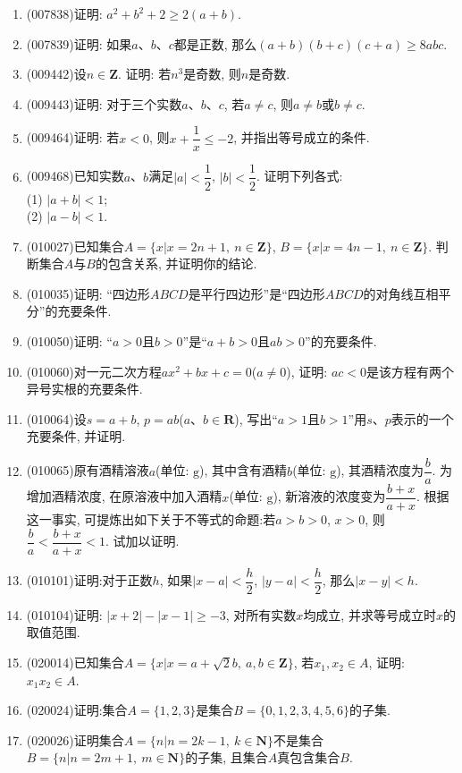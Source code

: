 \documentclass[10pt,a4paper]{article}
\begin{document}
\begin{enumerate}[1.]
\item {\tiny (007838)}证明: $a^2+b^2+2\ge 2(a+b)$.
\item {\tiny (007839)}证明: 如果$a$、$b$、$c$都是正数, 那么$(a+b)(b+c)(c+a)\ge 8abc$.
\item {\tiny (009442)}设$n\in \mathbf{Z}$. 证明: 若$n^3$是奇数, 则$n$是奇数.
\item {\tiny (009443)}证明: 对于三个实数$a$、$b$、$c$, 若$a\ne c$, 则$a\ne b$或$b\ne c$.
\item {\tiny (009464)}证明: 若$x<0$, 则$x+\dfrac 1x\le -2$, 并指出等号成立的条件.
\item {\tiny (009468)}已知实数$a$、$b$满足$|a| <\dfrac 12$, $|b| <\dfrac 12$. 证明下列各式:\\
(1) $|a+b| <1$;\\
(2) $|a-b| <1$.
\item {\tiny (010027)}已知集合$A=\{x|x=2n+1,\ n\in \mathbf{Z}\}$, $B=\{x|x=4n-1,\ n\in \mathbf{Z}\}$. 判断集合$A$与$B$的包含关系, 并证明你的结论.
\vspace*{16ex}
\item {\tiny (010035)}证明: ``四边形$ABCD$是平行四边形''是``四边形$ABCD$的对角线互相平分''的充要条件.
\item {\tiny (010050)}证明: ``$a>0$且$b>0$''是``$a+b>0$且$ab>0$''的充要条件.
\item {\tiny (010060)}对一元二次方程$ax^2+bx+c=0$($a\ne 0$), 证明: $ac<0$是该方程有两个异号实根的充要条件.
\item {\tiny (010064)}设$s=a+b$, $p=ab$($a$、$b\in\mathbf{R}$), 写出``$a>1$且$b>1$''用$s$、$p$表示的一个充要条件, 并证明.
\item {\tiny (010065)}原有酒精溶液$a$(单位: $\text{g}$), 其中含有酒精$b$(单位: $\text{g}$), 其酒精浓度为$\dfrac ba$. 为增加酒精浓度, 在原溶液中加入酒精$x$(单位: $\text{g}$), 新溶液的浓度变为$\dfrac{b+x}{a+x}$. 根据这一事实, 可提炼出如下关于不等式的命题:若$a>b>0$, $x>0$, 则$\dfrac ba<\dfrac{b+x}{a+x}<1$. 试加以证明.
\item {\tiny (010101)}证明:对于正数$h$, 如果$|x-a| <\dfrac h2$, $|y-a| <\dfrac h2$, 那么$|x-y| <h$.
\item {\tiny (010104)}证明: $|x+2|-|x-1|\ge -3$, 对所有实数$x$均成立, 并求等号成立时$x$的取值范围.
\item {\tiny (020014)}已知集合$A=\{x|x=a+\sqrt 2b,\ a,b\in \mathbf{Z}\}$, 若$x_1,x_2\in A$, 证明: $x_1x_2\in A$.
\item {\tiny (020024)}证明:集合$A=\{1,2,3\}$是集合$B=\{0,1,2,3,4,5,6\}$的子集.
\item {\tiny (020026)}证明集合$A=\{n|n=2k-1,\ k\in \mathbf{N}\}$不是集合$B=\{n|n=2m+1, \ m\in \mathbf{N}\}$的子集, 且集合$A$真包含集合$B$.

\end{enumerate}
\end{document}
